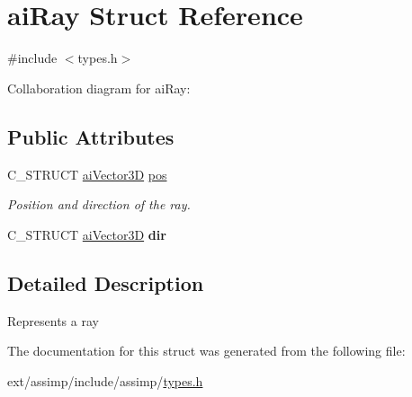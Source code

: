 \hypertarget{structai_ray}{\section{ai\-Ray Struct Reference}
\label{structai_ray}
}


{\ttfamily \#include $<$types.\-h$>$}



Collaboration diagram for ai\-Ray\-:
\subsection*{Public Attributes}
\begin{DoxyCompactItemize}
\item 
\hypertarget{structai_ray_a312f663a7d2580b1b3beb52ffd4ab4c9}{C\-\_\-\-S\-T\-R\-U\-C\-T \hyperlink{structai_vector3_d}{ai\-Vector3\-D} \hyperlink{structai_ray_a312f663a7d2580b1b3beb52ffd4ab4c9}{pos}}\label{structai_ray_a312f663a7d2580b1b3beb52ffd4ab4c9}

\begin{DoxyCompactList}\small\item\em Position and direction of the ray. \end{DoxyCompactList}\item 
\hypertarget{structai_ray_a635d9120af2654716e5e7952d837282b}{C\-\_\-\-S\-T\-R\-U\-C\-T \hyperlink{structai_vector3_d}{ai\-Vector3\-D} {\bfseries dir}}\label{structai_ray_a635d9120af2654716e5e7952d837282b}

\end{DoxyCompactItemize}


\subsection{Detailed Description}
Represents a ray 

The documentation for this struct was generated from the following file\-:\begin{DoxyCompactItemize}
\item 
ext/assimp/include/assimp/\hyperlink{types_8h}{types.\-h}\end{DoxyCompactItemize}
